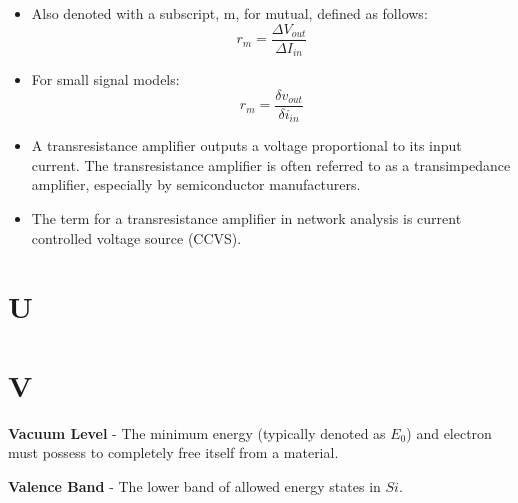     \begin{itemize}
        \setlength\itemsep{0.5em}
        \item{Also denoted with a subscript, m, for mutual, defined as follows:}
            \begin{equation}
                r_m = \frac{\Delta V_{out}}{\Delta I_{in}}
            \end{equation}
        \item{For small signal models:}
            \begin{equation}
                r_m = \frac{\delta v_{out}}{\delta i_{in}}
            \end{equation}
        \item{A transresistance amplifier outputs a voltage proportional to its input current. The transresistance amplifier is often referred to as a transimpedance amplifier, especially by semiconductor manufacturers.}
        \item{The term for a transresistance amplifier in network analysis is current controlled voltage source (CCVS).}
    \end{itemize}
\section{U}
\section{V}
    \textbf{Vacuum Level} - The minimum energy (typically denoted as $E_0$) and electron must possess to completely free itself from a material.

\vspace{0.5cm}
\noindent
    \textbf{Valence Band} - The lower band of allowed energy states in $Si$.

